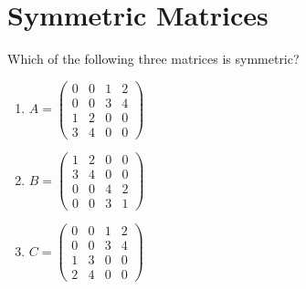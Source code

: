 \section{Symmetric Matrices}
	Which of the following three matrices is symmetric?
\begin{enumerate}
	\item$A=\begin{pmatrix}
	0&0&1&2\\
	0&0&3&4\\
	1&2&0&0\\
	3&4&0&0
	\end{pmatrix}$
	\item $B=\begin{pmatrix}
	1&2&0&0\\
	3&4&0&0\\
	0&0&4&2\\
	0&0&3&1
	\end{pmatrix}$
	\item $C=\begin{pmatrix}
	0&0&1&2\\
	0&0&3&4\\
	1&3&0&0\\
	2&4&0&0
	\end{pmatrix}$
\end{enumerate}
